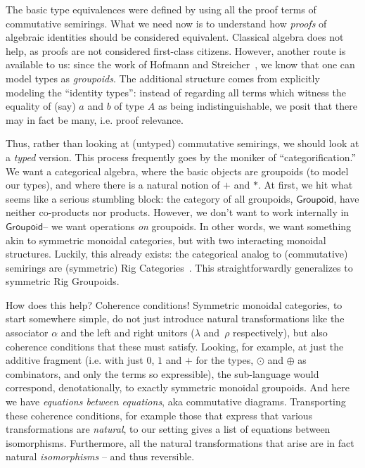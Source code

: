 \documentclass[sigplan,review,anonymous]{acmart}\settopmatter{printfolios=true,printccs=false,printacmref=false}
\newcommand{\Gpd}{\ensuremath{\mathsf{Groupoid}}}
\begin{document}
The basic type equivalences were defined by using all the
proof terms of commutative semirings. What we need
now is to understand how \emph{proofs} of algebraic identities should be
considered equivalent. Classical algebra does not help, as proofs
are not considered first-class citizens. However,
another route is available to us: since the work of
Hofmann and Streicher~\cite{hofmann96thegroupoid}, we know that
one can model types as \emph{groupoids}.  The additional
structure comes from explicitly modeling the ``identity
types'': instead of regarding all terms which witness
the equality of (say) $a$ and $b$ of type $A$ as being
indistinguishable, we posit that there may in fact be many,
i.e. proof relevance.

Thus, rather than looking at (untyped) commutative semirings, we
should look at a \emph{typed} version. This process frequently goes by
the moniker of ``categorification.''  We want a categorical algebra,
where the basic objects are groupoids (to model our types), and where
there is a natural notion of $+$ and $*$.  At first, we hit what seems
like a serious stumbling block: the category of all groupoids, \Gpd,
have neither co-products nor products. However, we don't want to work
internally in \Gpd -- we want operations \emph{on} groupoids. In other
words, we want something akin to symmetric monoidal categories, but
with two interacting monoidal structures.  Luckily, this already
exists: the categorical analog to (commutative) semirings are
(symmetric) Rig Categories~\cite{laplaza72,kelly74}.  This
straightforwardly generalizes to symmetric Rig Groupoids.

How does this help? Coherence conditions! Symmetric monoidal categories,
to start somewhere simple, do not just introduce natural transformations
like the associator $\alpha$ and the left and right unitors ($\lambda$
and~$\rho$ respectively), but also coherence conditions that these must satisfy.
Looking, for example, at just the additive fragment (i.e. with just $0$,
$1$ and $+$ for the types, $\odot$ and $\oplus$ as combinators, and
only the terms so expressible), the sub-language would correspond,
denotationally, to exactly symmetric monoidal groupoids. And
here we have \emph{equations between equations}, aka
commutative diagrams.  Transporting these coherence conditions, for
example those that express that various transformations are \emph{natural},
to our setting gives a list of equations between isomorphisms.
Furthermore, all the natural transformations
that arise are in fact natural \emph{isomorphisms} -- and thus
reversible.
\end{document}

